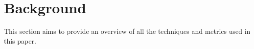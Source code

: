 \documentclass{sig-alternate-05-2015}
\begin{document}
%	

	
	\section{Background}
	This section aims to provide an overview of all the techniques and metrics used in this paper.
\end{document}
